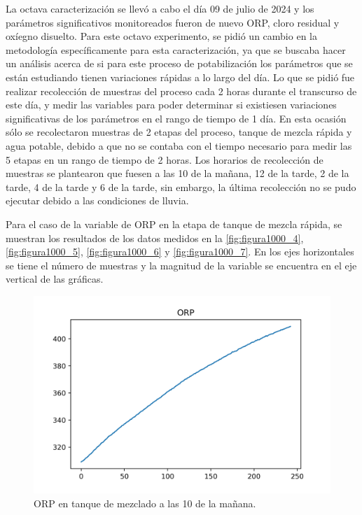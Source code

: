 La octava caracterización se llevó a cabo el día 09 de julio de 2024 y los parámetros significativos monitoreados fueron de nuevo ORP, cloro residual y oxíegno disuelto. Para este octavo experimento, se pidió 
un cambio en la metodología específicamente para esta caracterización, ya que se buscaba hacer un análisis acerca de si para este proceso de potabilización los parámetros  que se están estudiando tienen 
variaciones rápidas a lo largo del día. Lo que se pidió fue realizar recolección de muestras del proceso cada 2 horas durante el transcurso de este día, y medir las variables para poder determinar 
si existiesen variaciones significativas de los parámetros en el rango de tiempo de 1 día. En esta ocasión sólo se recolectaron muestras de 2 etapas del proceso, tanque de mezcla rápida y agua potable, debido a que no se contaba 
con el tiempo necesario para medir las 5 etapas en un rango de tiempo de 2 horas. Los horarios de recolección de muestras se plantearon que 
fuesen a las 10 de la mañana, 12 de la tarde, 2 de la tarde, 4 de la tarde y 6 de la tarde, sin embargo, la última recolección no se pudo ejecutar debido a las condiciones de lluvia.

Para el caso de la variable de ORP en la etapa de tanque de mezcla rápida, se muestran los resultados de los datos medidos en la \autoref{fig:figura1000_4}, \autoref{fig:figura1000_5}, \autoref{fig:figura1000_6} y \autoref{fig:figura1000_7}.
En los ejes horizontales se tiene el número de muestras y la magnitud de la variable se encuentra en el eje vertical de las gráficas.

\clearpage

\begin{figure}[h]
	\centering
	\includegraphics[scale=0.7]{imgss157.png}
	\caption{ORP en tanque de mezclado a las 10 de la mañana.}
	\label{fig:figura1000_4}
\end{figure}

